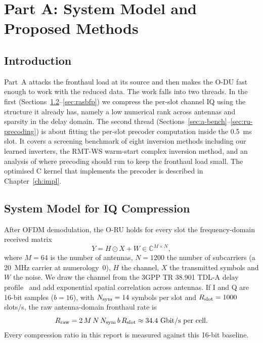 \chapter{Part A: System Model and Proposed Methods}
\label{ch:parta-methods}
\thispagestyle{plain}

\section{Introduction}

Part~A attacks the fronthaul load at its source and then makes the O-DU fast enough to work with the reduced data. The work falls into two threads. In the first (Sections~\ref{sec:a-model}--\ref{sec:rasbfp}) we compress the per-slot channel IQ using the structure it already has, namely a low numerical rank across antennas and sparsity in the delay domain. The second thread (Sections~\ref{sec:a-bench}--\ref{sec:ru-precoding}) is about fitting the per-slot precoder computation inside the 0.5~ms slot. It covers a screening benchmark of eight inversion methods including our learned inverters, the RMT-WS warm-start complex inversion method, and an analysis of where precoding should run to keep the fronthaul load small. The optimised C kernel that implements the precoder is described in Chapter~\ref{ch:impl}.

\section{System Model for IQ Compression}
\label{sec:a-model}

After OFDM demodulation, the O-RU holds for every slot the frequency-domain received matrix
\begin{equation}
  Y = H \odot X + W \in \mathbb{C}^{M\times N},
  \label{eq:a-model}
\end{equation}
where $M = 64$ is the number of antennas, $N = 1200$ the number of subcarriers (a 20~MHz carrier at numerology~0), $H$ the channel, $X$ the transmitted symbols and $W$ the noise. We draw the channel from the 3GPP TR 38.901 TDL-A delay profile~\cite{tr38901} and add exponential spatial correlation across antennas. If I and Q are 16-bit samples ($b = 16$), with $N_{\rm sym} = 14$ symbols per slot and $R_{\rm slot} = 1000$ slots/s, the raw antenna-domain fronthaul rate is
\begin{equation}
  R_{\rm raw} = 2\, M\, N\, N_{\rm sym}\, b\, R_{\rm slot} \approx 34.4~\text{Gbit/s per cell}.
\end{equation}
Every compression ratio in this report is measured against this 16-bit baseline.

